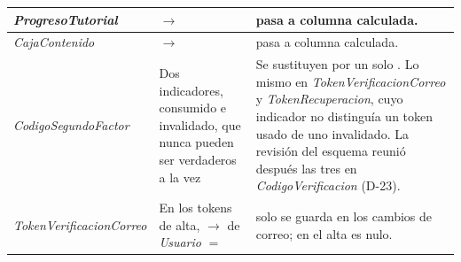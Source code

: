 \begin{center}
\begin{longtable}{|L{0.18\textwidth}|L{0.34\textwidth}|L{0.38\textwidth}|}
\textit{ProgresoTutorial} &  $\rightarrow$  &  pasa a columna calculada. \\ \hline
\textit{CajaContenido} &  $\rightarrow$  &  pasa a columna calculada. \\ \hline
\textit{CodigoSegundo\-Factor} & Dos indicadores, consumido e invalidado, que nunca pueden ser verdaderos a la vez & Se sustituyen por un solo . Lo mismo en \textit{TokenVerificacionCorreo} y \textit{TokenRecuperacion}, cuyo indicador  no distinguía un token usado de uno invalidado. La revisión del esquema reunió después las tres en \textit{CodigoVerificacion} (\mbox{D-23}). \\ \hline
\textit{TokenVerificacion\-Correo} & En los tokens de alta,  $\rightarrow$  de \textit{Usuario} $=$  &  solo se guarda en los cambios de correo; en el alta es nulo. \\ \hline
\end{longtable}
\end{center}
